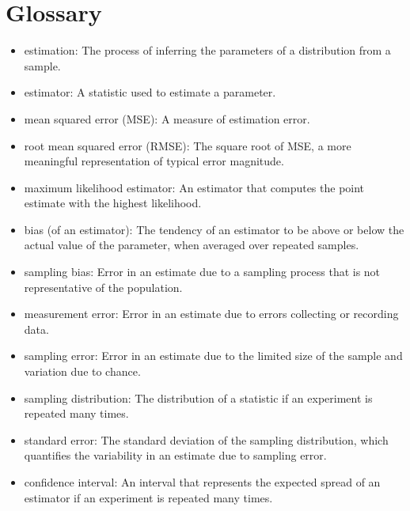\documentclass[12pt]{book}
\begin{document}
\section{Glossary}

\begin{itemize}

\item estimation: The process of inferring the parameters of a distribution
from a sample.

\item estimator: A statistic used to estimate a parameter.

\item mean squared error (MSE): A measure of estimation error.

\item root mean squared error (RMSE): The square root of MSE,
a more meaningful representation of typical error magnitude.

\item maximum likelihood estimator: An estimator that computes the
point estimate with the highest likelihood.

\item bias (of an estimator): The tendency of an estimator to be above or
  below the actual value of the parameter, when averaged over repeated
  samples.  

\item sampling bias: Error in an estimate due to a sampling process
  that is not representative of the population. 

\item measurement error: Error in an estimate due to errors collecting
  or recording data. 

\item sampling error: Error in an estimate due to the limited
  size of the sample and variation due to chance. 

\item sampling distribution: The distribution of a statistic if an
experiment is repeated many times.

\item standard error: The standard deviation of the sampling distribution,
which quantifies the variability in an estimate due to sampling error.

\item confidence interval: An interval that represents the expected
  spread of an estimator if an experiment is repeated many times.
   

\end{itemize}
\end{document}
